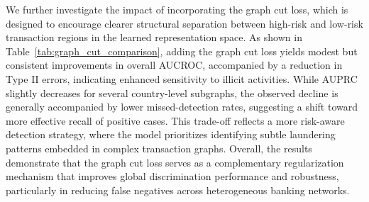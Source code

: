 \begin{table}[h!]
    \centering
    \caption{Performance comparison with and without graph cut loss}
    \label{tab:graph_cut_comparison}
\end{table}


We further investigate the impact of incorporating the graph cut loss, which is designed to encourage clearer structural separation between high-risk and low-risk transaction regions in the learned representation space. As shown in Table~\ref{tab:graph_cut_comparison}, adding the graph cut loss yields modest but consistent improvements in overall AUCROC, accompanied by a reduction in Type II errors, indicating enhanced sensitivity to illicit activities. While AUPRC slightly decreases for several country-level subgraphs, the observed decline is generally accompanied by lower missed-detection rates, suggesting a shift toward more effective recall of positive cases. This trade-off reflects a more risk-aware detection strategy, where the model prioritizes identifying subtle laundering patterns embedded in complex transaction graphs. Overall, the results demonstrate that the graph cut loss serves as a complementary regularization mechanism that improves global discrimination performance and robustness, particularly in reducing false negatives across heterogeneous banking networks.

